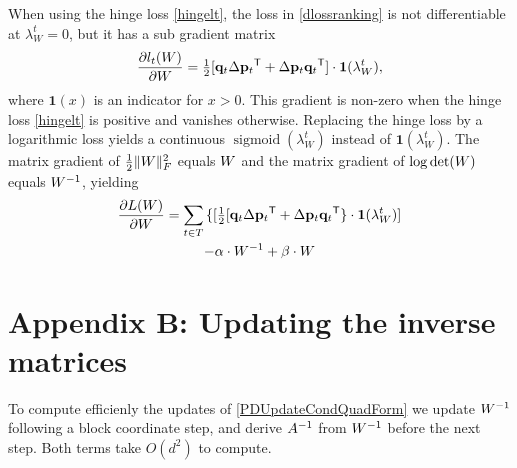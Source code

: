\documentclass{article}
\begin{document}
When using the hinge loss \eqref{hingelt}, the loss in \eqref{dlossranking} is not differentiable at $\lambda_{W}^t = 0$, but it has a sub gradient matrix
\begin{equation}
\frac{\partial {l_t ({W})}}{\partial {W}} = \tfrac{1}{2}[\mathbf{q}_{t}\Delta\mathbf{p}_{t}{}^\mathsf{T}  + \Delta\mathbf{p}_{t}\mathbf{q}_{t}{}^\mathsf{T}] \cdot \textbf{1}(\lambda_{W}^t),
\end{equation}
where $\textbf{1}(x)$ is an indicator for $x>0$. This gradient is non-zero when the hinge loss \eqref{hingelt} is positive and vanishes otherwise. Replacing the hinge loss by a logarithmic loss yields a continuous $\operatorname{sigmoid}(\lambda_{W}^t)$ instead of $\textbf{1}(\lambda_{W}^t)$.  
The matrix gradient of $\tfrac{1}{2} \| {W} \|_{F}^{2}$ equals ${W}$ and the matrix gradient of  $\log \det({W})$ equals ${W}^{-1}$, yielding 
\begin{multline}
\frac{\partial {L ({W})}}{\partial {W}} = 
\sum\limits_{t\in T}{\{ [\tfrac{1}{2}[\mathbf{q}_{t}\Delta\mathbf{p}_{t}{}^\mathsf{T} + \Delta\mathbf{p}_{t}\mathbf{q}_{t}{}^\mathsf{T} \} } \cdot \textbf{1}(\lambda_{W}^t)] \\- \alpha \cdot {W}^{-1} + \beta \cdot {W} 
\label{gradMat}
\end{multline}


\section*{Appendix B: Updating the inverse matrices}
\label{appendix-inverse}

To compute efficienly  the updates of \eqref{PDUpdateCondQuadForm} we update ${W}^{-1}$ following a block coordinate step, and derive $A^{-1}$ from ${W}^{-1}$ before the next step. Both terms take $O(d^2)$ to compute.
\end{document}

